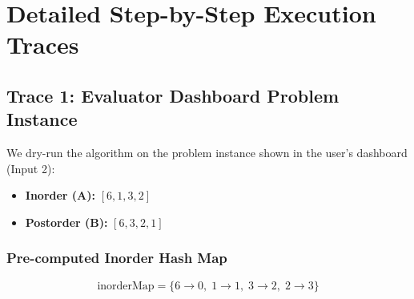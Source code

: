 \documentclass[10pt,journal,compsoc,onecolumn]{IEEEtran}
\begin{document}
\section{Detailed Step-by-Step Execution Traces}
\label{sec:traces}

\subsection{Trace 1: Evaluator Dashboard Problem Instance}
We dry-run the algorithm on the problem instance shown in the user's dashboard (Input 2):
\begin{itemize}
    \item \textbf{Inorder (A):} $[6, 1, 3, 2]$
    \item \textbf{Postorder (B):} $[6, 3, 2, 1]$
\end{itemize}

\subsubsection{Pre-computed Inorder Hash Map}
\[
\text{inorderMap} = \{6 \to 0,\; 1 \to 1,\; 3 \to 2,\; 2 \to 3\}
\]
\end{document}
